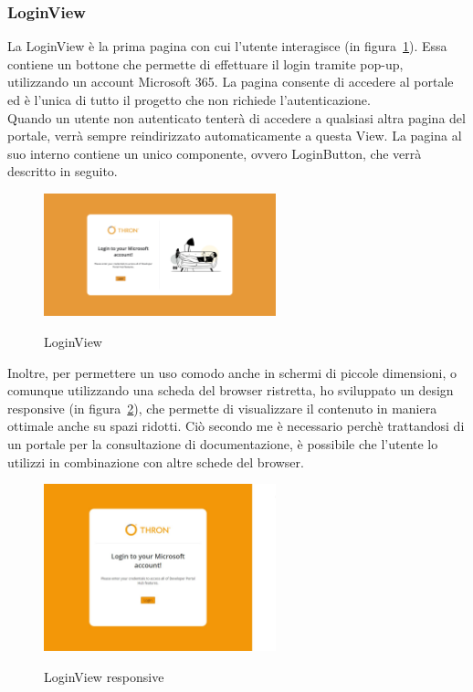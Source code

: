 \subsubsection{LoginView}\label{subsubsec:login-view}
La LoginView è la prima pagina con cui l'utente interagisce (in figura~\ref{fig:login-view}). Essa contiene un bottone che permette di effettuare il login tramite pop-up, utilizzando un account Microsoft 365.
La pagina consente di accedere al portale ed è l'unica di tutto il progetto che non richiede l'autenticazione.\\
Quando un utente non autenticato tenterà di accedere a qualsiasi altra pagina del portale, verrà sempre reindirizzato
automaticamente a questa View. La pagina al suo interno contiene un unico componente, ovvero LoginButton, che verrà descritto in seguito.
\begin{figure}[ht]
  \centering
  \includegraphics[width=0.6\textwidth, alt={Pagina di login dell'applicazione}]{images/frontend/LoginView.jpg}
  \caption{LoginView}\label{fig:login-view}
\end{figure}

Inoltre, per permettere un uso comodo anche in schermi di piccole dimensioni, o comunque utilizzando una scheda del browser ristretta, ho sviluppato
un design responsive (in figura~\ref{fig:login-view-responsive}), che permette di visualizzare il contenuto in maniera ottimale anche su spazi ridotti.
Ciò secondo me è necessario perchè trattandosi di un portale per la consultazione di documentazione, è possibile che l'utente 
lo utilizzi in combinazione con altre schede del browser.

\begin{figure}[ht]
  \centering
  \includegraphics[width=0.6\textwidth, alt={Pagina di login responsive dell'applicazione}]{images/frontend/LoginViewRes.jpg}
  \caption{LoginView responsive}\label{fig:login-view-responsive}
\end{figure}


